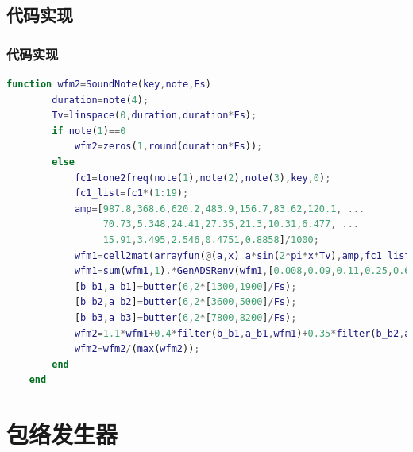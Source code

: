 \documentclass[utf8,10pt]{beamer}
\begin{document}
\subsection{代码实现}
\begin{frame}[fragile]
    \frametitle{代码实现}

    \begin{lstlisting}[language=matlab,style=lgeneral,gobble=4]
    function wfm2=SoundNote(key,note,Fs)
        duration=note(4);
        Tv=linspace(0,duration,duration*Fs);
        if note(1)==0
            wfm2=zeros(1,round(duration*Fs));
        else
            fc1=tone2freq(note(1),note(2),note(3),key,0);
            fc1_list=fc1*(1:19);
            amp=[987.8,368.6,620.2,483.9,156.7,83.62,120.1, ...
                 70.73,5.348,24.41,27.35,21.3,10.31,6.477, ...
                 15.91,3.495,2.546,0.4751,0.8858]/1000;
            wfm1=cell2mat(arrayfun(@(a,x) a*sin(2*pi*x*Tv),amp,fc1_list,'UniformOutput',false).');
            wfm1=sum(wfm1,1).*GenADSRenv(wfm1,[0.008,0.09,0.11,0.25,0.67],[0.88,0.88,0.56,0.50,0]);
            [b_b1,a_b1]=butter(6,2*[1300,1900]/Fs);
            [b_b2,a_b2]=butter(6,2*[3600,5000]/Fs);
            [b_b3,a_b3]=butter(6,2*[7800,8200]/Fs);
            wfm2=1.1*wfm1+0.4*filter(b_b1,a_b1,wfm1)+0.35*filter(b_b2,a_b2,wfm1)+0.25*filter(b_b3,a_b3,wfm1);
            wfm2=wfm2/(max(wfm2));
        end
    end
    \end{lstlisting}

\end{frame}

\section{包络发生器}
\end{document}
